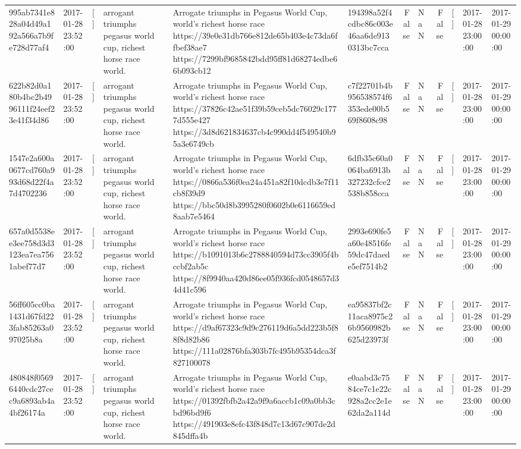 \begin{tabular}{llllllrlrlll}
995ab7341e828a04d49a192a566a7b9fe728d77af4 & 2017-01-28 23:52:00 & [] & arrogant triumphs pegasus world cup, richest horse race world. & Arrogate triumphs in Pegasus World Cup, world's richest horse race https://39e0e31db766e812de65b403e4c73da6ffbef38ae7 https://7299bf9685842bdd95ff81d68274edbe66b093cb12 & 194398a52f4cdbc86c003e46aa6de9130313bc7cca & False & NaN & False & [] & 2017-01-28 23:00:00 & 2017-01-29 00:00:00 \\
622b82d0a180b4bc2b4996111f24eef23e41f34d86 & 2017-01-28 23:52:00 & [] & arrogant triumphs pegasus world cup, richest horse race world. & Arrogate triumphs in Pegasus World Cup, world's richest horse race https://37826c42ae51f39b59ceb5dc76029c1777d555e427 https://3d8d621834637cb4c990dd4f549540b95a3e6749cb & c7f22701b4b956538574f6353ede00b569f8608c98 & False & NaN & False & [] & 2017-01-28 23:00:00 & 2017-01-29 00:00:00 \\
1547e2a600a0677cd760a993d68d22f4a7d4702236 & 2017-01-28 23:52:00 & [] & arrogant triumphs pegasus world cup, richest horse race world. & Arrogate triumphs in Pegasus World Cup, world's richest horse race https://0866a536f0ea24a451a82f10dcdb3e7f11cb8f39d9 https://bbc50d8b3995280f0602b0e6116659ed8aab7e5464 & 6dfb35c60a0064ba6913b327232cfce2538b858cca & False & NaN & False & [] & 2017-01-28 23:00:00 & 2017-01-29 00:00:00 \\
657a0d5538ee3ee758d3d3123ea7ea7561abef77d7 & 2017-01-28 23:52:00 & [] & arrogant triumphs pegasus world cup, richest horse race world. & Arrogate triumphs in Pegasus World Cup, world's richest horse race https://b1091013b6c2788840594d73cc3905f4bccbf2ab5c https://8f9940aa420d86ee05f936fcd0548657d34d41c596 & 2993e690fe5a60e48516fe59dc47daede5ef7514b2 & False & NaN & False & [] & 2017-01-28 23:00:00 & 2017-01-29 00:00:00 \\
56ff605cc0ba1431d67fd223fab85263a097025b8a & 2017-01-28 23:52:00 & [] & arrogant triumphs pegasus world cup, richest horse race world. & Arrogate triumphs in Pegasus World Cup, world's richest horse race https://d9af67323c9d9c276119d6a5dd223b5f88f8d82b86 https://111a02876bfa303b7fc495b95354dca3f827100078 & ea95837bf2c11aca8975c26b9560982b625d23973f & False & NaN & False & [] & 2017-01-28 23:00:00 & 2017-01-29 00:00:00 \\
480848f05696440cdc27cec9a6893ab4a4bf26174a & 2017-01-28 23:52:00 & [] & arrogant triumphs pegasus world cup, richest horse race world. & Arrogate triumphs in Pegasus World Cup, world's richest horse race https://01392fbfb2a42a9f9a6accb1c09a0bb3cbd96bd9f6 https://491903e8efc43f848d7c13d67c907de2d845dffa4b & e0aabd3c7584ce7c1e22c928a2cc2e1e62da2a114d & False & NaN & False & [] & 2017-01-28 23:00:00 & 2017-01-29 00:00:00 \\

\end{tabular}
